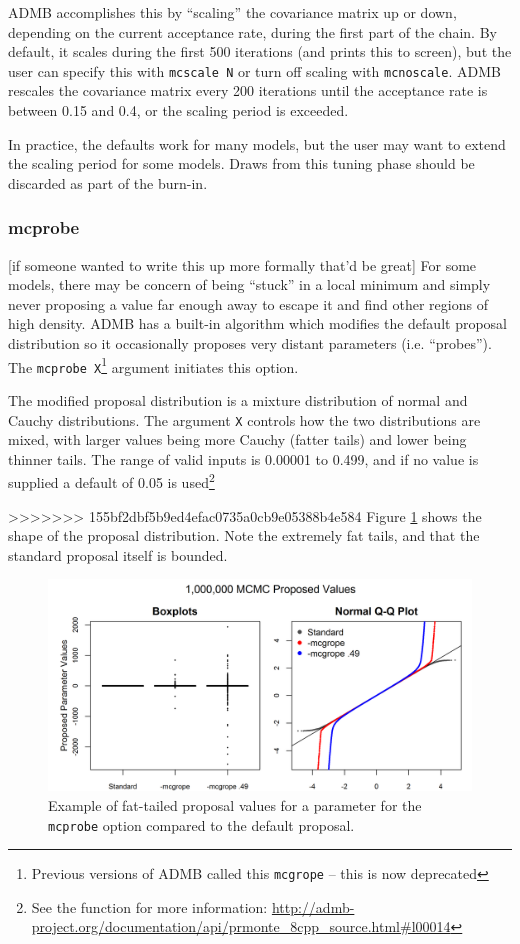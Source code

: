 \documentclass{article}\usepackage[]{graphicx}\usepackage[]{color}
\begin{document}
ADMB accomplishes this by ``scaling'' the covariance matrix
up or down, depending on the current acceptance rate, during
the first part of the chain. By default, it scales during
the first 500 iterations (and prints this to screen), but
the user can specify this with \texttt{mcscale N} or turn
off scaling with \texttt{mcnoscale}. ADMB rescales the
covariance matrix every 200 iterations until the acceptance
rate is between 0.15 and 0.4, or the scaling period is
exceeded.

In practice, the defaults work for many models, but the user
may want to extend the scaling period for some models. Draws
from this tuning phase should be discarded as part of the
burn-in.
\subsubsection{mcprobe}\label{sec:mcprobe}
\large{[if someone wanted to write this up more formally
  that'd be great]}
For some models, there may be concern of being ``stuck'' in
a local minimum and simply never proposing a value far
enough away to escape it and find other regions of high
density. ADMB has a built-in algorithm which modifies the
default proposal distribution so it occasionally proposes
very distant parameters (i.e. ``probes''). The
\texttt{mcprobe X}\footnote{Previous versions of ADMB called
  this \texttt{mcgrope} -- this is now deprecated} argument
initiates this option.

The modified proposal distribution is a mixture distribution
of normal and Cauchy distributions. The argument \texttt{X}
controls how the two distributions are mixed, with larger
values being more Cauchy (fatter tails) and lower being
thinner tails. The range of valid inputs is 0.00001 to
0.499, and if no value is supplied a default of 0.05 is
used\footnote{See the function for more information:
  \url{http://admb-project.org/documentation/api/prmonte\_8cpp\_source.html\#l00014}}

>>>>>>> 155bf2dbf5b9ed4efac0735a0cb9e05388b4e584
Figure \ref{fig:mcgrope_example} shows the shape of the
proposal distribution. Note the extremely fat tails, and
that the standard proposal itself is bounded.

\begin{figure}[h]
  \centering
  \includegraphics[width=5in]{../plots/mcgrope_example.png}
  \caption{Example of fat-tailed proposal values for a
    parameter for the \texttt{mcprobe} option compared to
    the default proposal.}
  \label{fig:mcgrope_example}
\end{figure}
\end{document}
